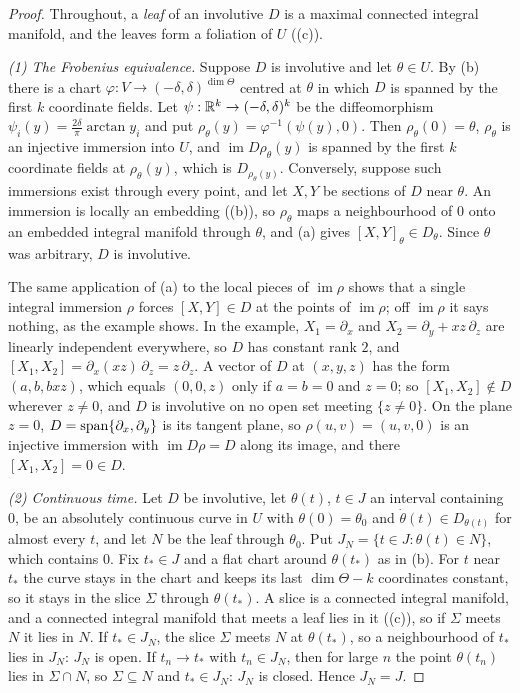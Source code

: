\begin{proof}
Throughout, a \emph{leaf} of an involutive $D$ is a maximal connected integral manifold, and the leaves form a foliation
of $U$ ((c)).

\emph{(1) The Frobenius equivalence.} Suppose $D$ is involutive and let $\theta\in U$. By (b) there is a chart
$\varphi:V\to(-\delta,\delta)^{\dim\Theta}$ centred at $\theta$ in which $D$ is spanned by the first $k$
coordinate fields. Let $\psi:\mathbb{R}^k\to(-\delta,\delta)^k$ be the diffeomorphism $\psi_i(y)=\tfrac{2\delta}{\pi}\arctan y_i$ and
put $\rho_\theta(y)=\varphi^{-1}(\psi(y),0)$. Then $\rho_\theta(0)=\theta$, $\rho_\theta$ is an injective immersion into
$U$, and $\operatorname{im}D\rho_\theta(y)$ is spanned by the first $k$ coordinate fields at $\rho_\theta(y)$, which is
$D_{\rho_\theta(y)}$. Conversely, suppose such immersions exist through every point, and let $X,Y$ be sections of $D$ near
$\theta$. An immersion is locally an embedding ((b)), so $\rho_\theta$ maps a neighbourhood of $0$ onto an
embedded integral manifold through $\theta$, and (a) gives $[X,Y]_\theta\in D_\theta$. Since $\theta$ was
arbitrary, $D$ is involutive.

The same application of (a) to the local pieces of $\operatorname{im}\rho$ shows that a single integral
immersion $\rho$ forces $[X,Y]\in D$ at the points of $\operatorname{im}\rho$; off $\operatorname{im}\rho$ it says nothing, as
the example shows. In the example,
$X_1=\partial_x$ and $X_2=\partial_y+xz\,\partial_z$ are linearly independent everywhere, so $D$ has constant rank $2$, and
$[X_1,X_2]=\partial_x(xz)\,\partial_z=z\,\partial_z$. A vector of $D$ at $(x,y,z)$ has the form $(a,b,bxz)$, which equals
$(0,0,z)$ only if $a=b=0$ and $z=0$; so $[X_1,X_2]\notin D$ wherever $z\ne0$, and $D$ is involutive on no open set meeting
$\{z\ne0\}$. On the plane $z=0$, $D=\operatorname{span}\{\partial_x,\partial_y\}$ is its tangent plane, so $\rho(u,v)=(u,v,0)$ is an
injective immersion with $\operatorname{im}D\rho=D$ along its image, and there $[X_1,X_2]=0\in D$.

\emph{(2) Continuous time.} Let $D$ be involutive, let $\theta(t)$, $t\in J$ an interval containing $0$, be an absolutely
continuous curve in $U$ with $\theta(0)=\theta_0$ and $\dot\theta(t)\in D_{\theta(t)}$ for almost every $t$, and let $N$ be
the leaf through $\theta_0$. Put $J_N=\{t\in J:\theta(t)\in N\}$, which contains $0$. Fix $t_*\in J$ and a flat chart around
$\theta(t_*)$ as in (b). For $t$ near $t_*$ the curve stays in the chart and keeps its last $\dim\Theta-k$
coordinates constant, so it stays in the slice $\Sigma$ through $\theta(t_*)$. A slice is a connected integral manifold, and
a connected integral manifold that meets a leaf lies in it ((c)), so if $\Sigma$ meets $N$ it lies in $N$. If $t_*\in J_N$, the slice $\Sigma$ meets $N$ at $\theta(t_*)$, so a neighbourhood of
$t_*$ lies in $J_N$: $J_N$ is open. If $t_n\to t_*$ with $t_n\in J_N$, then for large $n$ the point $\theta(t_n)$ lies in
$\Sigma\cap N$, so $\Sigma\subseteq N$ and $t_*\in J_N$: $J_N$ is closed. Hence $J_N=J$.


\end{proof}
